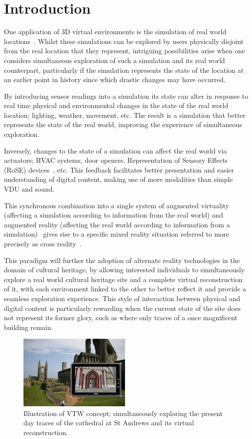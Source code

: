 \documentclass[conference,a4paper]{IEEEtran}
\begin{document}
\section{Introduction}
One application of 3D virtual environments is the simulation of real world locations~\cite{wright:duality}. Whilst these simulations can be explored by users physically disjoint from the real location that they represent, intriguing possibilities arise when one considers simultaneous exploration of such a simulation and its real world counterpart, particularly if the simulation represents the state of the location at an earlier point in history since which drastic changes may have occurred.

By introducing sensor readings into a simulation its state can alter in response to real time physical and environmental changes in the state of the real world location; lighting, weather, movement, etc. The result is a simulation that better represents the state of the real world, improving the experience of simultaneous exploration.

Inversely, changes to the state of a simulation can affect the real world via actuators; HVAC systems, door openers, Representation of Sensory Effects (RoSE) devices~\cite{Timmerer2008}, etc. This feedback facilitates better presentation and easier understanding of digital content, making use of more modalities than simple VDU and sound.

This synchronous combination into a single system of augmented virtuality (affecting a simulation according to information from the real world) and augmented reality (affecting the real world according to information from a simulation)~\cite{Want2009} gives rise to a specific mixed reality situation referred to more precisely as cross reality~\cite{kim:practical}.

This paradigm will further the adoption of alternate reality technologies in the domain of cultural heritage, by allowing interested individuals to simultaneously explore a real world cultural heritage site and a complete virtual reconstruction of it, with each environment linked to the other to better reflect it and provide a seamless exploration experience. This style of interaction between physical and digital content is particularly rewarding when the current state of the site does not represent its former glory, such as where only traces of a once magnificent building remain.

\begin{figure}[!t]
\centering
\includegraphics[width=0.49\textwidth]{mockup.jpg}
\caption{Illustration of VTW concept; simultaneously exploring the present day traces of the cathedral at St Andrews and its virtual reconstruction.}
\label{mockup}
\end{figure}
\end{document}
